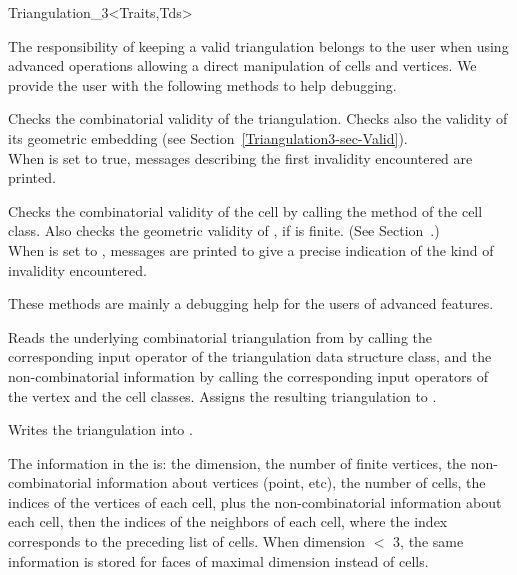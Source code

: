 \begin{ccClassTemplate}{Triangulation_3<Traits,Tds>}
\begin{ccAdvanced}
The responsibility of keeping a valid triangulation belongs to the user
when using advanced operations allowing a direct manipulation of cells
and vertices. We provide the user with the following methods to help
debugging. 

{Checks the combinatorial validity of the triangulation. Checks also the
validity of its geometric embedding (see
Section~\ref{Triangulation3-sec-Valid}).\\ When  is set to true, 
messages describing the first invalidity encountered are printed.}

{Checks the combinatorial validity of the cell by calling the
 method of the  cell class. Also checks the
geometric validity of , if  is finite. (See
Section~\pageref{Triangulation3-sec-Valid}.)\\ 
When  is set to , messages are printed to give
a precise indication of the kind of invalidity encountered.}

These methods are mainly a debugging help for the users of advanced features.

\end{ccAdvanced}


{Reads the underlying combinatorial triangulation from  by
calling the corresponding input operator of the triangulation data
structure class, and the non-combinatorial information by calling the
corresponding input operators of the vertex and the cell
classes. Assigns the resulting triangulation to .}

{Writes the triangulation  into .}

The information in the  is: the dimension, the number of
finite vertices, the non-combinatorial information about vertices (point,
etc), the number of cells, the indices of the vertices of each cell,
plus the non-combinatorial information about each cell, 
then the indices of the neighbors of each cell, where the index
corresponds to the preceding list of cells. When dimension $<$ 3, the
same information is stored for faces of maximal dimension instead of
cells. 

\end{ccClassTemplate}

